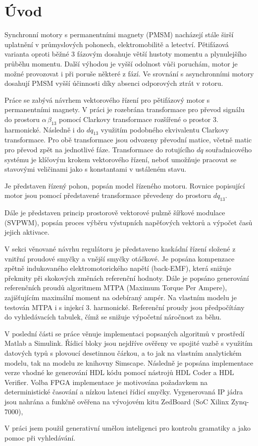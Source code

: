 \chapter*{Úvod}
{}
Synchronní motory s permanentními magnety (PMSM) nacházejí stále širší uplatnění
v průmyslových pohonech, elektromobilitě a letectví. Pětifázová varianta oproti běžné 3 fázovým dosahuje větší hustoty momentu a plynulejšího průběhu momentu. Další výhodou je vyšší odolnost vůči poruchám, motor je možné provozovat i při poruše některé z fází. Ve srovnání s asynchronními motory dosahují PMSM vyšší účinnosti díky absenci odporových ztrát v rotoru.

Práce se zabývá návrhem vektorového řízení pro pětifázový motor s permanentními magnety. V práci je rozebrána transformace pro převod signálu do prostoru $\alpha \, \beta_{13}$ pomocí Clarkovy transformace rozšířené o prostor 3. harmonické. Následně i do $dq_{13}$ využitím podobného ekvivalentu Clarkovy transformace. Pro obě transformace jsou odvozeny převodní matice, včetně matic pro převod zpět na jednotlivé fáze. Transformace do rotujícího $dq$ souřadnicového systému je klíčovým krokem vektorového řízení, neboť umožňuje pracovat se stavovými veličinami jako s konstantami v ustáleném stavu.

Je představen řízený pohon, popsán model řízeného motoru. Rovnice popisující motor jsou pomocí představené transformace převedeny do prostoru $dq_{13}$.

Dále je představen princip prostorově vektorové pulzně šířkové modulace (SVPWM), popsán proces výběru výstupních napěťových vektorů a výpočet časů jejich aktivace.

V sekci věnované návrhu regulátoru je představeno kaskádní řízení složené z vnitřní proudové smyčky a vnější smyčky otáčkové. Je popsána kompenzace zpětně indukovaného elektromotorického napětí (back-EMF), která snižuje překmity při skokových změnách referenční hodnoty. Dále je popsáno generování referenčních proudů algoritmem MTPA (Maximum Torque Per Ampere), zajišťujícím maximální moment na odebíraný ampér. Na vlastním modelu je testován MTPA i s injekcí 3. harmonické. Referenční proudy jsou předpočítány do vyhledávacích tabulek, čímž se snižuje výpočetní náročnost za běhu.

V poslední části se práce věnuje implementaci popsaných algoritmů v prostředí Matlab a Simulink. Řídicí bloky jsou nejdříve ověřeny ve spojité vazbě s využitím datových typů s plovoucí desetinnou čárkou, a to jak na vlastním analytickém modelu, tak na modelu ze knihovny Simscape. Následně je popsána implementace verze vhodné ke generování HDL kódu pomocí nástrojů HDL Coder a HDL Verifier. Volba FPGA implementace je motivována požadavkem na deterministické časování a nízkou latenci řídicí smyčky. Vygenerovaná IP jádra jsou nahrána a funkčně ověřena na vývojovém kitu ZedBoard (SoC Xilinx Zynq-7000),


V práci jsem použil generativní umělou inteligenci pro kontrolu gramatiky a jako pomoc při vyhledávání.
